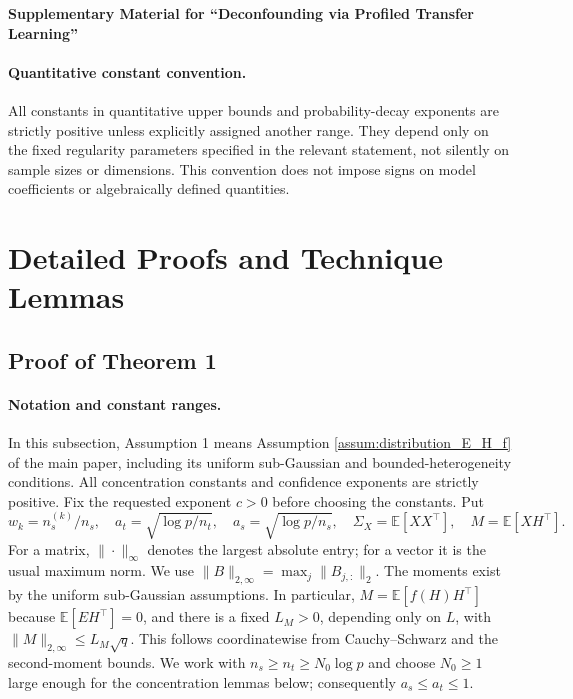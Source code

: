\documentclass[12pt]{article}
\begin{document}
%

\def\spacingset#1{\renewcommand{\baselinestretch}%
{#1}\small\normalsize} \spacingset{1}


\spacingset{1.9}
  \bigskip
  \bigskip
  \bigskip
  \begin{center}
    {\LARGE\bf Supplementary Material for ``Deconfounding via Profiled Transfer Learning''}
\end{center}
  \medskip


\paragraph{Quantitative constant convention.}
All constants in quantitative upper bounds and probability-decay exponents
are strictly positive unless explicitly assigned another range. They depend
only on the fixed regularity parameters specified in the relevant statement,
not silently on sample sizes or dimensions. This convention does not impose
signs on model coefficients or algebraically defined quantities.

\section{Detailed Proofs and Technique Lemmas}
\subsection{Proof of Theorem 1}
\paragraph{Notation and constant ranges.}
In this subsection, Assumption 1 means Assumption
\ref{assum:distribution_E_H_f} of the main paper, including its uniform
sub-Gaussian and bounded-heterogeneity conditions. All concentration
constants and confidence exponents are strictly positive. Fix the requested
exponent $c>0$ before choosing the constants. Put
\[
 w_k=n_s^{(k)}/n_s,\quad a_t=\sqrt{\log p/n_t},\quad
 a_s=\sqrt{\log p/n_s},\quad
 \Sigma_X=\mathbb E[XX^\top],\quad M=\mathbb E[XH^\top].
\]
For a matrix, $\|\cdot\|_\infty$ denotes the largest absolute entry; for a
vector it is the usual maximum norm. We use
$\|B\|_{2,\infty}=\max_j\|B_{j,:}\|_2$.
The moments exist by the uniform sub-Gaussian assumptions. In particular,
$M=\mathbb E[f(H)H^\top]$ because $\mathbb E[EH^\top]=0$, and there is a
fixed $L_M>0$, depending only on $L$, with $\|M\|_{2,\infty}\le L_M\sqrt q$.
This follows coordinatewise from Cauchy--Schwarz and the second-moment
bounds. We work with $n_s\ge n_t\ge N_0\log p$ and choose $N_0\ge1$ large
enough for the concentration lemmas below; consequently $a_s\le a_t\le1$.
\end{document}
